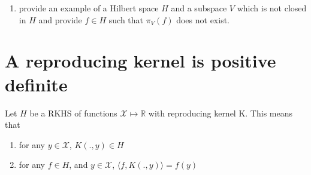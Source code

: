 \documentclass{article}[12pt]
\begin{document}
\begin{enumerate}
\item provide an example of a Hilbert space $H$ and a subspace $V$ which is not closed in $H$ and provide $f \in H$ such that $\pi_V(f)$ does not exist. 
\end{enumerate}

\section{A reproducing kernel is positive definite}
Let $H$ be a RKHS of functions $\mathcal{X} \mapsto \mathbb{R}$ with reproducing kernel K. This means that 
\begin{enumerate}
\item for any $y \in \mathcal{X}$, $K(.,y) \in H$
\item for any $f \in H$, and $y \in \mathcal{X}$, $\langle f, K(.,y) \rangle = f(y)$
\end{enumerate}
\end{document}
